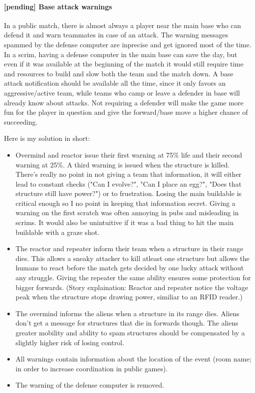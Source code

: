 \documentclass{scrartcl}
\newcommand{\pending}  [0]{\textcolor{pending}  {\textbf{[pending] }}}
\begin{document}
\paragraph{\pending Base attack warnings}

In a public match, there is almost always a player near the main base who can defend it and warn teammates in case of an attack. The warning messages spammed by the defense computer are inprecise and get ignored most of the time. In a scrim, having a defense computer in the main base can save the day, but even if it was available at the beginning of the match it would still require time and resources to build and slow both the team and the match down. A base attack notification should be available all the time, since it only favors an aggressive/active team, while teams who camp or leave a defender in base will already know about attacks. Not requiring a defender will make the game more fun for the player in question and give the forward/base move a higher chance of succeeding.

Here is my solution in short:

\begin{itemize}
\item Overmind and reactor issue their first warning at 75\% life and their second warning at 25\%. A third warning is issued when the structure is killed. There's really no point in not giving a team that information, it will either lead to constant checks ("Can I evolve?", "Can I place an egg?", "Does that structure still have power?") or to frustration. Losing the main buildable is critical enough so I no point in keeping that information secret. Giving a warning on the first scratch was often annoying in pubs and misleading in scrims. It would also be unintuitive if it was a bad thing to hit the main buildable with a graze shot.
\item The reactor and repeater inform their team when a structure in their range dies. This allows a sneaky attacker to kill atleast one structure but allows the humans to react before the match gets decided by one lucky attack without any struggle. Giving the repeater the same ability ensures some protection for bigger forwards. (Story explaination: Reactor and repeater notice the voltage peak when the structure stops drawing power, similiar to an RFID reader.)
\item The overmind informs the aliens when a structure in its range dies. Aliens don't get a message for structures that die in forwards though. The aliens greater mobility and ability to spam structures should be compensated by a slightly higher risk of losing control.
\item All warnings contain information about the location of the event (room name; in order to increase coordination in public games).
\item The warning of the defense computer is removed.
\end{itemize}
\end{document}
